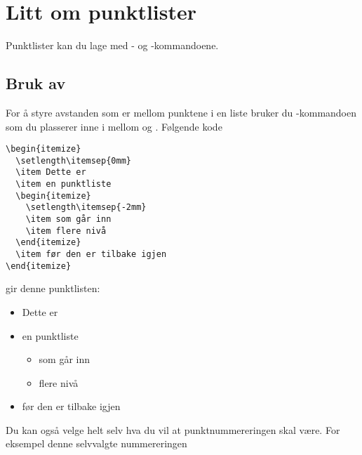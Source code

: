 
\chapter{Litt om punktlister}\label{kap:punktlister}

Punktlister kan du lage med 
- og
-kommandoene.

\section{Bruk av }
For å styre avstanden som er mellom punktene i en liste bruker du
-kommandoen som
du plasserer inne i mellom 
 og
.
Følgende kode 

\begin{boxedminipage}{\textwidth}
\begin{verbatim}
\begin{itemize}
  \setlength\itemsep{0mm}
  \item Dette er
  \item en punktliste
  \begin{itemize}
    \setlength\itemsep{-2mm}
    \item som går inn 
    \item flere nivå
  \end{itemize}
  \item før den er tilbake igjen
\end{itemize}
\end{verbatim}
\end{boxedminipage}

gir denne punktlisten: 
\begin{itemize}
  \setlength\itemsep{0mm}
  \item Dette er
  \item en punktliste
  \begin{itemize}
     \setlength\itemsep{-2mm}
     \item som går inn 
     \item flere nivå
   \end{itemize}
 \item før den er tilbake igjen
\end{itemize}

Du kan også velge helt selv hva du vil at punktnummereringen skal
være. For eksempel denne selvvalgte nummereringen

